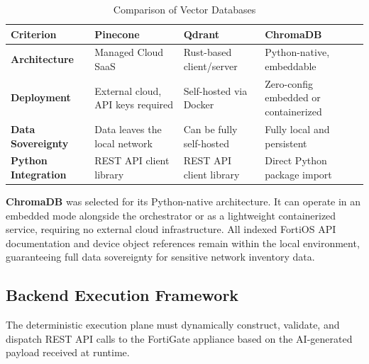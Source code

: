 \begin{table}[htbp]
    \small
    \centering
    \renewcommand{\arraystretch}{1.4}
    \begin{tabular}{|p{3.0cm}|p{3.5cm}|p{3.5cm}|p{3.8cm}|}
        \hline
        \textbf{Criterion} & \textbf{Pinecone} & \textbf{Qdrant} & \textbf{ChromaDB} \\
        \hline
        \textbf{Architecture} & Managed Cloud SaaS & Rust-based client/server & Python-native, embeddable \\
        \hline
        \textbf{Deployment} & External cloud, API keys required & Self-hosted via Docker & Zero-config embedded or containerized \\
        \hline
        \textbf{Data Sovereignty} & Data leaves the local network & Can be fully self-hosted & Fully local and persistent \\
        \hline
        \textbf{Python Integration} & REST API client library & REST API client library & Direct Python package import \\
        \hline
    \end{tabular}
    \caption{Comparison of Vector Databases}
    \label{tab:vector_db}
\end{table}

\textbf{ChromaDB} was selected for its Python-native architecture. It can operate in an embedded mode alongside the orchestrator or as a lightweight containerized service, requiring no external cloud infrastructure. All indexed FortiOS API documentation and device object references remain within the local environment, guaranteeing full data sovereignty for sensitive network inventory data.

\subsection{Backend Execution Framework}
The deterministic execution plane must dynamically construct, validate, and dispatch REST API calls to the FortiGate appliance based on the AI-generated payload received at runtime.


